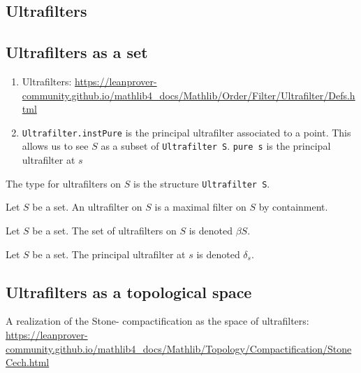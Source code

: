 \subsection{Ultrafilters}

\subsection{Ultrafilters as a set}

\begin{leanrmk}
    \begin{enumerate}
        \item Ultrafilters: \url{https://leanprover-community.github.io/mathlib4_docs/Mathlib/Order/Filter/Ultrafilter/Defs.html}
    
        \item \verb|Ultrafilter.instPure| is the principal ultrafilter associated to a point.  This allows us to see $S$ as a subset of \verb|Ultrafilter S|.  \verb|pure s| is the principal ultrafilter at $s$
    \end{enumerate}
\end{leanrmk}

\begin{leanrmk}
    The type for ultrafilters on $S$ is the structure \verb|Ultrafilter S|.
\end{leanrmk}

\begin{definition}[Ultrafilter]
    Let $S$ be a set.  An ultrafilter on $S$ is a maximal filter on $S$ by containment. 
\end{definition}

\begin{definition}
    Let $S$ be a set.  The set of ultrafilters on $S$ is denoted $\beta S$.
\end{definition}



\begin{definition}
    Let $S$ be a set.  The principal ultrafilter at $s$ is denoted $\delta_s$.
\end{definition}

\subsection{Ultrafilters as a topological space}

\begin{leanrmk}
    A realization of the Stone-\Cech{} compactification as the space of ultrafilters: \url{https://leanprover-community.github.io/mathlib4_docs/Mathlib/Topology/Compactification/StoneCech.html}
\end{leanrmk}

